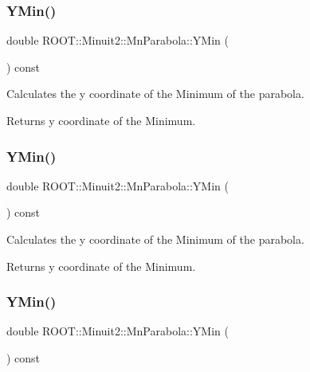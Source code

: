\subsubsection{\texorpdfstring{YMin()}{YMin()}\hspace{0.1cm}{\footnotesize\ttfamily [1/3]}}
{\footnotesize\ttfamily double R\+O\+O\+T\+::\+Minuit2\+::\+Mn\+Parabola\+::\+Y\+Min (\begin{DoxyParamCaption}{ }\end{DoxyParamCaption}) const\hspace{0.3cm}{\ttfamily [inline]}}

Calculates the y coordinate of the Minimum of the parabola.

\begin{DoxyReturn}{Returns}
y coordinate of the Minimum. 
\end{DoxyReturn}
\mbox{\label{classROOT_1_1Minuit2_1_1MnParabola_a7efab0e0a9902151738605a552adef41}} 
\subsubsection{\texorpdfstring{YMin()}{YMin()}\hspace{0.1cm}{\footnotesize\ttfamily [2/3]}}
{\footnotesize\ttfamily double R\+O\+O\+T\+::\+Minuit2\+::\+Mn\+Parabola\+::\+Y\+Min (\begin{DoxyParamCaption}{ }\end{DoxyParamCaption}) const\hspace{0.3cm}{\ttfamily [inline]}}

Calculates the y coordinate of the Minimum of the parabola.

\begin{DoxyReturn}{Returns}
y coordinate of the Minimum. 
\end{DoxyReturn}
\mbox{\label{classROOT_1_1Minuit2_1_1MnParabola_a7efab0e0a9902151738605a552adef41}} 
\subsubsection{\texorpdfstring{YMin()}{YMin()}\hspace{0.1cm}{\footnotesize\ttfamily [3/3]}}
{\footnotesize\ttfamily double R\+O\+O\+T\+::\+Minuit2\+::\+Mn\+Parabola\+::\+Y\+Min (\begin{DoxyParamCaption}{ }\end{DoxyParamCaption}) const\hspace{0.3cm}{\ttfamily [inline]}}

